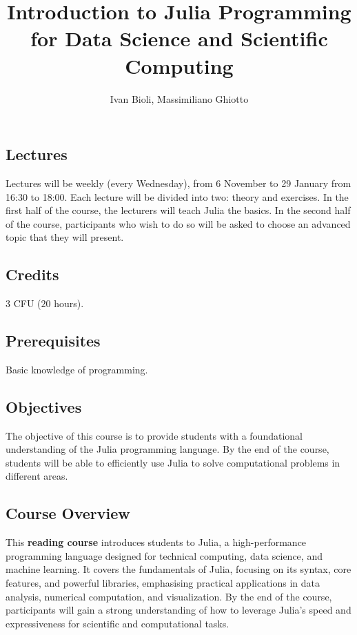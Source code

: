 \documentclass{article}
\title{Introduction to Julia Programming for Data Science and Scientific Computing}
\author{Ivan Bioli, Massimiliano Ghiotto}
\date{}
\begin{document}
\maketitle


\subsection*{Lectures}
Lectures will be weekly (every Wednesday), from 6 November to 29 January from 16:30 to 18:00.
Each lecture will be divided into two: theory and exercises. In the first half of the course, the lecturers will teach Julia the basics. In the second half of the course, participants who wish to do so will be asked to choose an advanced topic that they will present.

\subsection*{Credits}
$3$ CFU ($20$ hours).

\subsection*{Prerequisites}
Basic knowledge of programming.

\subsection*{Objectives}
The objective of this course is to provide students with a foundational understanding of the Julia programming language. By the end of the course, students will be able to efficiently use Julia to solve computational problems in different areas.

\subsection*{Course Overview}
This \textbf{reading course} introduces students to Julia, a high-performance programming language designed for technical computing, data science, and machine learning. It covers the fundamentals of Julia, focusing on its syntax, core features, and powerful libraries, emphasising practical applications in data analysis, numerical computation, and visualization. By the end of the course, participants will gain a strong understanding of how to leverage Julia's speed and expressiveness for scientific and computational tasks.
\end{document}
